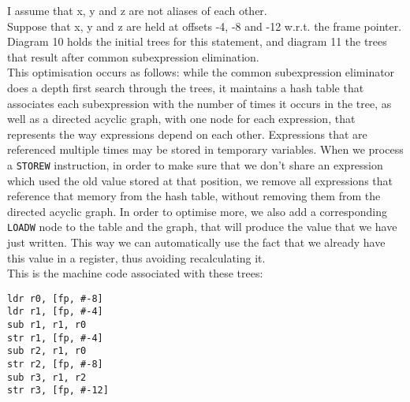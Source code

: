 I assume that x, y and z are not aliases of each other. \\
Suppose that x, y and z are held at offsets -4, -8 and -12 w.r.t. the frame pointer. Diagram 10 holds the initial trees for this statement, and diagram 11 the trees that result after common subexpression elimination. \\
This optimisation occurs as follows: while the common subexpression eliminator does a depth first search through the trees, it maintains a hash table that associates each subexpression with the number of times it occurs in the tree, as well as a directed acyclic graph, with one node for each expression, that represents the way expressions depend on each other. Expressions that are referenced multiple times may be stored in temporary variables. When we process a \texttt{STOREW} instruction, in order to make sure that we don't share an expression which used the old value stored at that position, we remove all expressions that reference that memory from the hash table, without removing them from the directed acyclic graph. In order to optimise more, we also add a corresponding \texttt{LOADW} node to the table and the graph, that will produce the value that we have just written. This way we can automatically use the fact that we already have this value in a register, thus avoiding recalculating it. \\
This is the machine code associated with these trees:

\begin{lstlisting}
ldr r0, [fp, #-8]
ldr r1, [fp, #-4]
sub r1, r1, r0
str r1, [fp, #-4]
sub r2, r1, r0
str r2, [fp, #-8]
sub r3, r1, r2
str r3, [fp, #-12]
\end{lstlisting}
